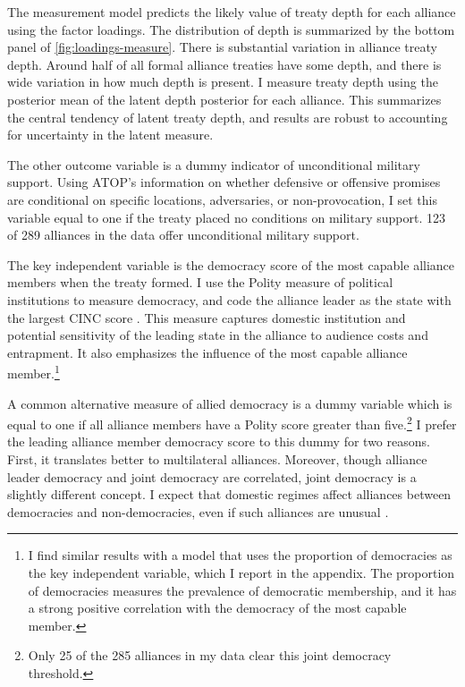 \documentclass[12pt]{article}
\begin{document}
The measurement model predicts the likely value of treaty depth for each alliance using the factor loadings. 
The distribution of depth is summarized by the bottom panel of \autoref{fig:loadings-measure}. 
There is substantial variation in alliance treaty depth. 
Around half of all formal alliance treaties have some depth, and there is wide variation in how much depth is present.
I measure treaty depth using the posterior mean of the latent depth posterior for each alliance. 
This summarizes the central tendency of latent treaty depth, and results are robust to accounting for uncertainty in the latent measure. 


The other outcome variable is a dummy indicator of unconditional military support. 
Using ATOP's information on whether defensive or offensive promises are conditional on specific locations, adversaries, or non-provocation, I set this variable equal to one if the treaty placed no conditions on military support.
123 of 289 alliances in the data offer unconditional military support. 


The key independent variable is the democracy score of the most capable alliance members when the treaty formed. 
I use the Polity measure of political institutions to measure democracy, and code the alliance leader as the state with the largest CINC score \citep{SingerCINC1988}.
This measure captures domestic institution and potential sensitivity of the leading state in the alliance to audience costs and entrapment.
It also emphasizes the influence of the most capable alliance member.\footnote{I find similar results with a model that uses the proportion of democracies as the key independent variable, which I report in the appendix. The proportion of democracies measures the prevalence of democratic membership, and it has a strong positive correlation with the democracy of the most capable member.}    


A common alternative measure of allied democracy is a dummy variable which is equal to one if all alliance members have a Polity score greater than five.\footnote{Only 25 of the 285 alliances in my data clear this joint democracy threshold.}
I prefer the leading alliance member democracy score to this dummy for two reasons.
First, it translates better to multilateral alliances. 
Moreover, though alliance leader democracy and joint democracy are correlated, joint democracy is a slightly different concept. 
I expect that domestic regimes affect alliances between democracies and non-democracies, even if such alliances are unusual \citep{Leeds1999}.
\end{document}
